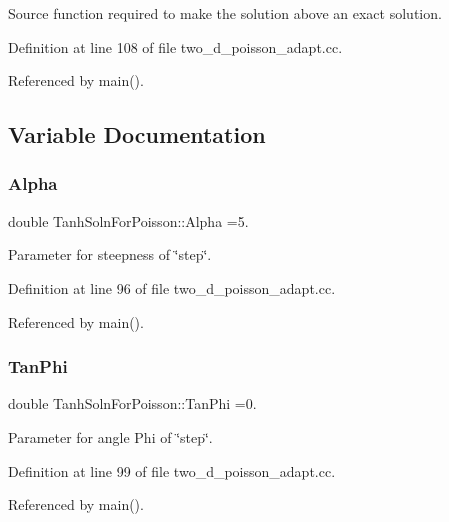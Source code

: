 Source function required to make the solution above an exact solution. 



Definition at line 108 of file two\+\_\+d\+\_\+poisson\+\_\+adapt.\+cc.



Referenced by main().



\subsection{Variable Documentation}
\mbox{\label{namespaceTanhSolnForPoisson_ae676ccd186d5df119cce811596d949c1}} 
\subsubsection{\texorpdfstring{Alpha}{Alpha}}
{\footnotesize\ttfamily double Tanh\+Soln\+For\+Poisson\+::\+Alpha =5.}



Parameter for steepness of \char`\"{}step\char`\"{}. 



Definition at line 96 of file two\+\_\+d\+\_\+poisson\+\_\+adapt.\+cc.



Referenced by main().

\mbox{\label{namespaceTanhSolnForPoisson_a785ccd00a727125a5138fbbcac173294}} 
\subsubsection{\texorpdfstring{Tan\+Phi}{TanPhi}}
{\footnotesize\ttfamily double Tanh\+Soln\+For\+Poisson\+::\+Tan\+Phi =0.}



Parameter for angle Phi of \char`\"{}step\char`\"{}. 



Definition at line 99 of file two\+\_\+d\+\_\+poisson\+\_\+adapt.\+cc.



Referenced by main().

